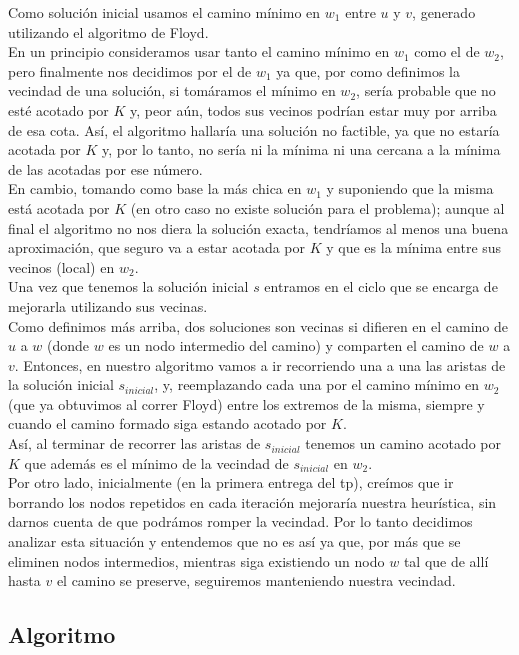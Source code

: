 Como soluci\'on inicial usamos el camino m\'inimo en $w_1$ entre $u$ y $v$, generado utilizando el algoritmo de Floyd.\\
En un principio consideramos usar tanto el camino m\'inimo en $w_1$ como el de $w_2$, pero finalmente nos decidimos por el de $w_1$ ya que, por como definimos la vecindad de una soluci\'on, si tom\'aramos el m\'inimo en $w_2$, ser\'ia probable que no est\'e acotado por $K$ y, peor a\'un, todos sus vecinos podr\'ian estar muy por arriba de esa cota. As\'i, el algoritmo hallar\'ia una soluci\'on no factible, ya que no estar\'ia acotada por $K$ y, por lo tanto, no ser\'ia ni la m\'inima ni una cercana a la m\'inima de las acotadas por ese n\'umero.\\
En cambio, tomando como base la m\'as chica en $w_1$ y suponiendo que la misma est\'a acotada por $K$ (en otro caso no existe soluci\'on para el problema); aunque al final el algoritmo no nos diera la soluci\'on exacta, tendr\'iamos al menos una buena aproximaci\'on, que seguro va a estar acotada por $K$ y que es la m\'inima entre sus vecinos (local) en $w_2$.\\
Una vez que tenemos la soluci\'on inicial $s$ entramos en el ciclo que se encarga de mejorarla utilizando sus vecinas.\\
Como definimos m\'as arriba, dos soluciones son vecinas si difieren en el camino de $u$ a $w$ (donde $w$ es un nodo intermedio del camino) y comparten el camino de $w$ a $v$. Entonces, en nuestro algoritmo vamos a ir recorriendo una a una las aristas de la soluci\'on inicial $s_{inicial}$, y, reemplazando cada una por el camino m\'inimo en $w_2$ (que ya obtuvimos al correr Floyd) entre los extremos de la misma, siempre y cuando el camino formado siga estando acotado por $K$.\\ 
As\'i, al terminar de recorrer las aristas de $s_{inicial}$ tenemos un camino acotado por $K$ que adem\'as es el m\'inimo de la vecindad de $s_{inicial}$ en $w_2$.\\
Por otro lado, inicialmente (en la primera entrega del tp), cre\'imos que ir borrando los nodos repetidos en cada iteraci\'on mejorar\'ia nuestra heur\'istica, sin darnos cuenta de que podr\'amos romper la vecindad. Por lo tanto decidimos analizar esta situaci\'on y entendemos que no es as\'i ya que, por m\'as que se eliminen nodos intermedios, mientras siga existiendo un nodo $w$ tal que de all\'i hasta $v$ el camino se preserve, seguiremos manteniendo nuestra vecindad.

\newpage
\subsection{Algoritmo}
